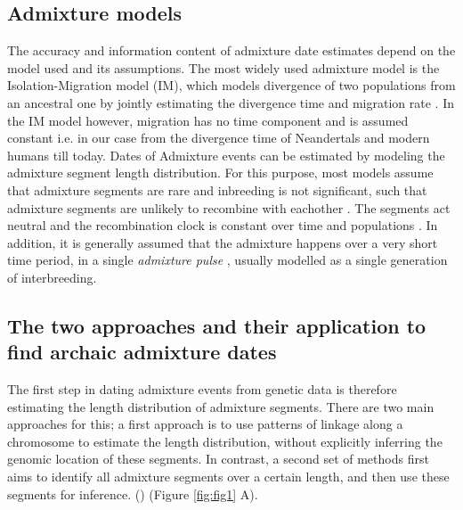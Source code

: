 \documentclass[]{article}
\begin{document}
\subsection{Admixture models}\label{Admixture models}

The accuracy and information content of admixture date estimates depend on the model used and its assumptions. The most widely used admixture model is the Isolation-Migration model (IM), which models divergence of two populations from an ancestral one by jointly estimating the divergence time and migration rate \citep{nielsen_distinguishing_2001,hey_multilocus_2004}. In the IM model however, migration has no time component and is assumed constant i.e. in our case from the divergence time of Neandertals and modern humans till today. Dates of Admixture events can be estimated by modeling the admixture segment length distribution. For this purpose, most models assume that admixture segments are rare and inbreeding is not significant, such that admixture segments are unlikely to recombine with eachother \citep{pool_inference_2009,liang_lengths_2014}. The segments act neutral \citep{shchur_distribution_2019} and the recombination clock is constant over time and populations \citep{gravel_population_2012}. In addition, it is generally assumed that the admixture happens over a very short time period, in a single \textit{admixture pulse} \citep{moorjani_history_2011}, usually modelled as a single generation of interbreeding.


\subsection{The two approaches and their application to find archaic admixture dates}\label{the-two-approaches-and-their-application-to-find-archaic-admixture-dates}

The first step in dating admixture events from genetic data is therefore estimating the length distribution of admixture segments.  There are two main approaches for this; a first approach is to use patterns of linkage along a chromosome to estimate the length distribution, without explicitly inferring the genomic location of these segments. In contrast, a second set of methods first aims to identify all admixture segments over a certain length, and then use these segments for inference. 
(\citep{chimusa_dating_2018}) (Figure \ref{fig:fig1} A).
\end{document}
